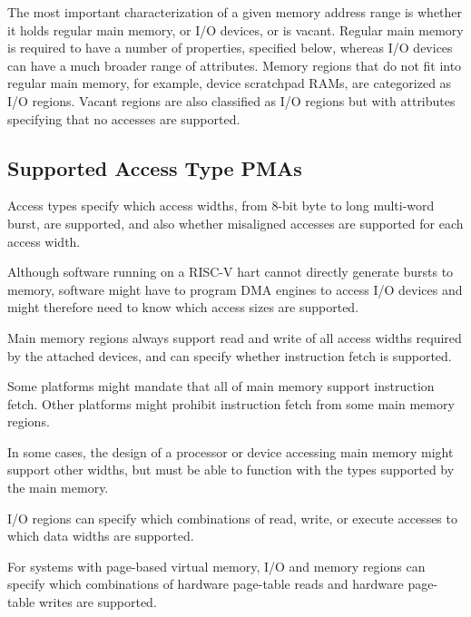 The most important characterization of a given memory address range is
whether it holds regular main memory, or I/O devices, or is vacant.
Regular main memory is required to have a number of properties,
specified below, whereas I/O devices can have a much broader range of
attributes.  Memory regions that do not fit into regular main
memory, for example, device scratchpad RAMs, are categorized as I/O
regions.  Vacant regions are also classified as I/O regions but with
attributes specifying that no accesses are supported.

\subsection{Supported Access Type PMAs}

Access types specify which access widths, from 8-bit byte to long
multi-word burst, are supported, and also whether misaligned accesses
are supported for each access width.

\begin{commentary}
Although software running on a RISC-V hart cannot directly generate
bursts to memory, software might have to program DMA engines to access
I/O devices and might therefore need to know which access sizes are
supported.
\end{commentary}

Main memory regions always support read and write of all
access widths required by the attached devices, and can
specify whether instruction fetch is supported.

\begin{commentary}
Some platforms might mandate that all of main memory support instruction
fetch.
Other platforms might prohibit instruction fetch from some main memory
regions.
\end{commentary}

\begin{commentary}
In some cases, the design of a processor or device accessing main
memory might support other widths, but must be able to function with
the types supported by the main memory.
\end{commentary}

I/O regions can specify which combinations of read, write, or execute
accesses to which data widths are supported.

For systems with page-based virtual memory, I/O and memory regions can
specify which combinations of hardware page-table reads and hardware
page-table writes are supported.

